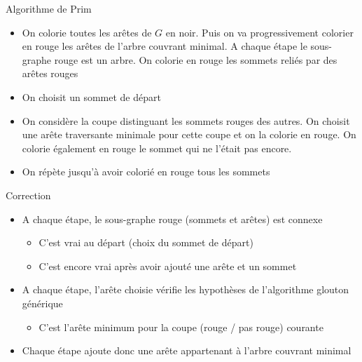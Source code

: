 \begin{frame}{Algorithme de Prim}
    \label{def:prim}
    \begin{itemize}
        \item On colorie toutes les arêtes de $G$ en noir. Puis on va progressivement colorier en rouge les arêtes de l'arbre couvrant minimal. A chaque étape le sous-graphe rouge est un arbre. On colorie en rouge les sommets reliés par des arêtes rouges
        \item On choisit un sommet de départ
        \item On considère la coupe distinguant  les sommets rouges des autres. On choisit une arête traversante minimale pour cette coupe et on la colorie en rouge. On colorie également en rouge le sommet qui ne l'était pas encore.
        \item On répète jusqu'à avoir colorié en rouge tous les sommets 
    \end{itemize}
\end{frame}

\begin{frame}{Correction}
\begin{itemize}
    \item A chaque étape, le sous-graphe rouge (sommets et arêtes) est connexe 
    \begin{itemize}
        \item C'est vrai au départ (choix du sommet de départ)
        \item C'est encore vrai après avoir ajouté une arête et un sommet 
    \end{itemize}
    \item A chaque étape, l'arête choisie vérifie les hypothèses de l'algorithme glouton générique 
    \begin{itemize}
        \item C'est l'arête minimum pour la coupe (rouge / pas rouge) courante 
    \end{itemize}
    \item Chaque étape ajoute donc une arête appartenant à l'arbre couvrant minimal 
\end{itemize}
\end{frame}

